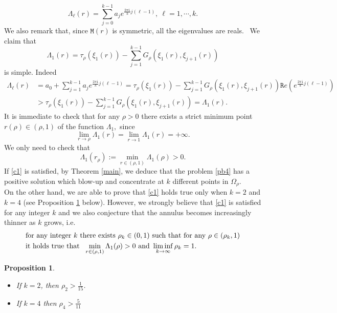 \documentclass[11pt,a4paper]{amsart}
\newtheorem{proposition}[theorem]{Proposition}
\theoremstyle{definition}
\renewcommand{\(}{\left(}
\renewcommand{\)}{\right)}
\begin{document}
\begin{equation*}
 \Lambda_{\ell}(r) = \sum_{j=0}^{k-1} a_j e^{\frac{2\pi \mathtt i}{k} j(\ell-1)}, \ \ell=1, \cdots, k.
\end{equation*}
We also remark that, since $\mathtt{M}(r)$ is symmetric, all the eigenvalues are reals. \ We claim that
$$\Lambda_1(r)=\tau_\rho(\xi_1(r))-\sum_{j=1}^{k-1}G_\rho(\xi_1(r), \xi_{j+1}(r)) $$
is simple.
Indeed
$$\begin{aligned} \Lambda_\ell(r)&=a_0 +\sum_{j=1}^{k-1}a_j e^{\frac{2\pi\mathtt i}{k}j(\ell-1)}=\tau_\rho(\xi_1(r))-\sum_{j=1}^{k-1}G_\rho(\xi_1(r), \xi_{j+1}(r))\mathtt Re\left(e^{\frac{2\pi\mathtt i}{k}j(\ell-1)}\right)\\
&>\tau_\rho(\xi_1(r))-\sum_{j=1}^{k-1}G_\rho(\xi_1(r), \xi_{j+1}(r))=\Lambda_1(r).\end{aligned}$$
It is immediate to check that for any $\rho>0$ there exists a strict minimum point $r(\rho)\in (\rho,1)$ of the function $\Lambda_1,$
since
$$\lim\limits_{r\to \rho}\Lambda_1(r)=\lim\limits_{r\to 1}\Lambda_1(r)=+\infty.$$
We only need to check that 
\begin{equation}\label{c1}\Lambda_1(r_\rho):=\min\limits_{r\in(\rho,1)}\Lambda_1(\rho)>0.\end{equation}
If \eqref{c1} is satisfied, by Theorem \ref{main}, we deduce that  the problem \eqref{pb4} has a positive solution which blow-up and concentrate at $k$ different points  in $\Omega_\rho.$ \\
On the other hand, we are able to prove that \eqref{c1} holds true only when $k=2$ and $k=4$ (see Proposition \ref{thmanello} below). However, we strongly believe that \eqref{c1} is satisfied for any integer $k$ and we also conjecture  that the annulus becomes increasingly thinner as 
$k$ grows, i.e.
\begin{equation}\label{CON}
 \begin{aligned}&\hbox{for any integer $k$ there exists $\rho_k\in(0,1)$ such that for any $\rho\in(\rho_k,1)$}\\
&\hbox{it holds true that }\  \min\limits_{r\in(\rho,1)}\Lambda_1(\rho)>0\ \hbox{and}\  \liminf\limits_{k\to\infty}\rho_k=1.\end{aligned}
\end{equation}
\begin{proposition}\label{thmanello} ${}$
\begin{itemize}
\item If $k=2$, then $\rho_2>\frac{1}{15}$.
\item If $k=4$  then  $\rho_4>\frac{5}{11}$
\end{itemize}\end{proposition}
\end{document}
